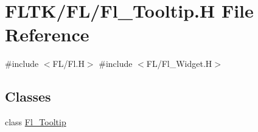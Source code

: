 \hypertarget{_fl___tooltip_8_h}{}\section{F\+L\+T\+K/\+F\+L/\+Fl\+\_\+\+Tooltip.H File Reference}
\label{_fl___tooltip_8_h}
{\ttfamily \#include $<$F\+L/\+Fl.\+H$>$}\newline
{\ttfamily \#include $<$F\+L/\+Fl\+\_\+\+Widget.\+H$>$}\newline
\subsection*{Classes}
\begin{DoxyCompactItemize}
\item 
class \hyperlink{class_fl___tooltip}{Fl\+\_\+\+Tooltip}
\end{DoxyCompactItemize}
